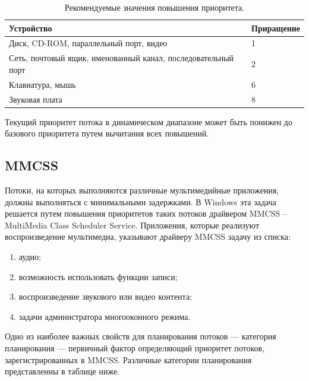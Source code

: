 \begin{table}[h!]
	\caption{Рекомендуемые значения повышения приоритета.}
	\begin{center}
		\begin{tabular}{|p{100mm}|l|}
			\hline
			\textbf{Устройство} & \textbf{Приращение} \\
			\hline
			Диск, CD-ROM, параллельный порт, видео & 1 \\
			\hline
			Сеть, почтовый ящик, именованный канал, последовательный порт & 2 \\
			\hline
			Клавиатура, мышь & 6 \\
			\hline
			Звуковая плата & 8 \\
			\hline
		\end{tabular}
	\end{center}
	\label{tab:io}
\end{table}

Текущий приоритет потока в динамическом диапазоне может быть понижен до базового приоритета путем вычитания всех повышений.

\subsection*{MMCSS}

Потоки, на которых выполняются различные мультимедийные приложения, должны выполняться с минимальными задержками. В Windows эта задача решается путем повышения приоритетов таких потоков драйвером MMCSS -- MultiMedia Class Scheduler Service. Приложения, которые реализуют воспроизведение мультимедиа, указывают драйверу MMCSS задачу из списка:

\begin{enumerate}[]
	\item аудио;
	\item возможность использовать функции записи;
	\item воспроизведение звукового или видео контента;
	\item задачи администратора многооконного режима.
\end{enumerate}

Одно из наиболее важных свойств для планирования потоков --- категория планирования --- первичный фактор определяющий приоритет потоков, зарегистрированных в MMCSS. Различные категории планирования представленны в таблице ниже.

